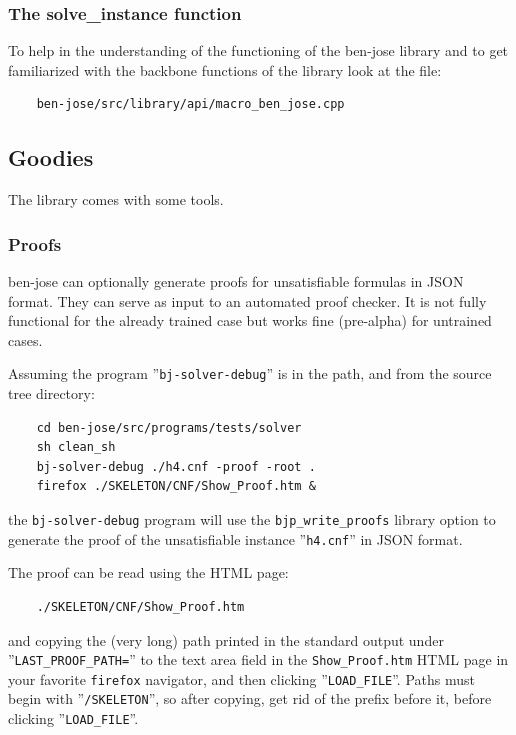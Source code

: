 \documentclass{easychair}
\newcommand{\bjbatchsolver}{\texttt{bj-solver-debug}}
\begin{document}
\subsubsection{The solve\_instance function}

To help in the understanding of the functioning of the ben-jose library and to get 
familiarized with the backbone functions of the library look at the file:

\begin{verbatim}
	ben-jose/src/library/api/macro_ben_jose.cpp
\end{verbatim}

\subsection{Goodies}

The library comes with some tools.

\subsubsection{Proofs}

ben-jose can optionally generate proofs for unsatisfiable formulas in JSON format. They can serve as input to an automated proof checker. It is not fully functional for the already trained case but works fine (pre-alpha) for untrained cases.

Assuming the program ''{\bjbatchsolver}'' is in the path, and from the source tree directory:

\begin{verbatim}
	cd ben-jose/src/programs/tests/solver
	sh clean_sh
	bj-solver-debug ./h4.cnf -proof -root .
	firefox ./SKELETON/CNF/Show_Proof.htm &
\end{verbatim}

the {\bjbatchsolver} program will use the \texttt{bjp\_write\_proofs} library option to generate the proof of the unsatisfiable instance ''\texttt{h4.cnf}'' in JSON format. 

The proof can be read using the HTML page:

\begin{verbatim}
	./SKELETON/CNF/Show_Proof.htm
\end{verbatim}

and copying the (very long) path printed in the standard output under ''\texttt{LAST\_PROOF\_PATH=}'' to the text area field in the \texttt{Show\_Proof.htm} HTML page in your favorite \texttt{firefox} navigator, and then clicking ''\texttt{LOAD\_FILE}''. Paths must begin with ''\texttt{/SKELETON}'', so after copying, get  rid of the prefix before it, before clicking ''\texttt{LOAD\_FILE}''.
\end{document}
